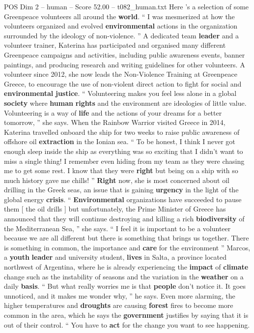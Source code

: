 \begin{textsample}{POS Dim 2 – human – Score 52.00 – t082\_human.txt}
Here ’s a selection of some Greenpeace volunteers all around the \textbf{world}. “ I was mesmerized at how the volunteers organized and evolved \textbf{environmental} actions in the organization surrounded by the ideology of non-violence. ” A dedicated team \textbf{leader} and a volunteer trainer, Katerina has participated and organised many different Greenpeace campaigns and activities, including public awareness events, banner paintings, and producing research and writing guidelines for other volunteers.
A volunteer since 2012, she now leads the Non-Violence Training at Greenpeace Greece, to encourage the use of non-violent direct action to fight for social and \textbf{environmental} \textbf{justice}. “ Volunteering makes you feel less alone in a global \textbf{society} where \textbf{human} \textbf{rights} and the environment are ideologies of little value.
Volunteering is a way of \textbf{life} and the actions of your dreams for a better tomorrow, ” she says.
When the Rainbow Warrior visited Greece in 2014, Katerina travelled onboard the ship for two weeks to raise public awareness of offshore oil \textbf{extraction} in the Ionian sea. “ To be honest, I think I never got enough sleep inside the ship as everything was so exciting that I didn't want to miss a single thing!
I remember even hiding from my team as they were chasing me to get some rest.
I know that they were \textbf{right} but being on a ship with so much history gave me chills! ” \textbf{Right} now, she is most concerned about oil drilling in the Greek seas, an issue that is gaining \textbf{urgency} in the light of the global energy \textbf{crisis}. “ \textbf{Environmental} organizations have succeeded to pause them [ the oil drills ] but unfortunately, the Prime Minister of Greece has announced that they will continue destroying and killing a rich \textbf{biodiversity} of the Mediterranean Sea, ” she says. “ I feel it is important to be a volunteer because we are all different but there is something that brings us together.
There is something in common, the importance and \textbf{care} for the environment ” Marcos, a \textbf{youth} \textbf{leader} and university student, \textbf{lives} in Salta, a province located northwest of Argentina, where he is already experiencing the \textbf{impact} of \textbf{climate} change such as the instability of seasons and the variation in the \textbf{weather} on a daily \textbf{basis}. “ But what really worries me is that \textbf{people} don't notice it.
It goes unnoticed, and it makes me wonder why, ” he says.
Even more alarming, the higher temperatures and \textbf{droughts} are causing \textbf{forest} fires to become more common in the area, which he says the \textbf{government} justifies by saying that it is out of their control. “ You have to \textbf{act} for the change you want to see happening.

\end{textsample}
